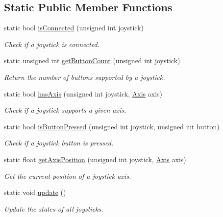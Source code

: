 \subsection*{Static Public Member Functions}
\begin{DoxyCompactItemize}
\item 
static bool \hyperlink{classsf_1_1Joystick_ac7d4e1923e9f9420174f26703ea63d6c}{is\-Connected} (unsigned int joystick)
\begin{DoxyCompactList}\small\item\em Check if a joystick is connected. \end{DoxyCompactList}\item 
static unsigned int \hyperlink{classsf_1_1Joystick_a4de9f445c6582bfe9f0873f695682885}{get\-Button\-Count} (unsigned int joystick)
\begin{DoxyCompactList}\small\item\em Return the number of buttons supported by a joystick. \end{DoxyCompactList}\item 
static bool \hyperlink{classsf_1_1Joystick_a268e8f2a11ae6af4a47c727cb4ab4d95}{has\-Axis} (unsigned int joystick, \hyperlink{classsf_1_1Joystick_a48db337092c2e263774f94de6d50baa7}{Axis} axis)
\begin{DoxyCompactList}\small\item\em Check if a joystick supports a given axis. \end{DoxyCompactList}\item 
static bool \hyperlink{classsf_1_1Joystick_ae0d97a4b84268cbe6a7078e1b2717835}{is\-Button\-Pressed} (unsigned int joystick, unsigned int button)
\begin{DoxyCompactList}\small\item\em Check if a joystick button is pressed. \end{DoxyCompactList}\item 
static float \hyperlink{classsf_1_1Joystick_aea4930193331df1851b709f3060ba58b}{get\-Axis\-Position} (unsigned int joystick, \hyperlink{classsf_1_1Joystick_a48db337092c2e263774f94de6d50baa7}{Axis} axis)
\begin{DoxyCompactList}\small\item\em Get the current position of a joystick axis. \end{DoxyCompactList}\item 
static void \hyperlink{classsf_1_1Joystick_ab85fa9175b4edd3e5a07ee3cde0b0f48}{update} ()
\begin{DoxyCompactList}\small\item\em Update the states of all joysticks. \end{DoxyCompactList}\end{DoxyCompactItemize}


